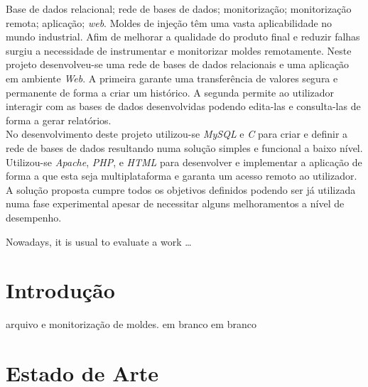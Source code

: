 \documentclass[11pt,twoside,a4paper]{report}
\begin{document}
\TitlePage
  \vspace*{55mm}
       {Base de dados relacional; rede de bases de dados; monitorização; monitorização remota; aplicação; \textit{web}.}
       {Moldes de injeção têm uma vasta aplicabilidade no mundo industrial. Afim de melhorar a qualidade do produto final e reduzir falhas surgiu a necessidade de instrumentar e monitorizar moldes remotamente. Neste projeto desenvolveu-se uma rede de bases de dados relacionais e uma aplicação em ambiente \textit{Web}. A primeira garante uma transferência de valores segura e permanente de forma a criar um histórico. A segunda permite ao utilizador interagir com as bases de dados desenvolvidas podendo edita-las e consulta-las de forma a gerar relatórios.\\
       	No desenvolvimento deste projeto utilizou-se \textit{MySQL} e \textit{C} para criar e definir a rede de bases de dados resultando numa solução simples e funcional a baixo nível. Utilizou-se \textit{Apache}, \textit{PHP}, e \textit{HTML} para desenvolver e implementar a aplicação de forma a que esta seja multiplataforma e garanta um acesso remoto ao utilizador.\\
       	A solução proposta cumpre todos os objetivos definidos podendo ser já utilizada numa fase experimental apesar de necessitar alguns melhoramentos a nível de desempenho.}
\EndTitlePage
\titlepage\ \endtitlepage %

\TitlePage
  \vspace*{55mm}
       {Nowadays, it is usual to evaluate a work \ldots}
\EndTitlePage
\titlepage\ \endtitlepage %


%
%

\tableofcontents

\cleardoublepage
\listoffigures

\cleardoublepage
\listoftables



\cleardoublepage
{}
\chapter{Introdução}
arquivo e monitorização de moldes.
\newpage
em branco
\newpage
em branco

\cleardoublepage
\chapter{Estado de Arte}
\end{document}
